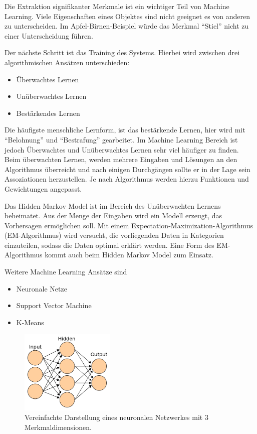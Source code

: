 Die Extraktion signifikanter Merkmale ist ein wichtiger Teil von Machine Learning. Viele Eigenschaften eines Objektes sind nicht geeignet es von anderen zu unterscheiden. Im Apfel-Birnen-Beispiel würde das Merkmal ``Stiel'' nicht zu einer Unterscheidung führen.

Der nächste Schritt ist das Training des Systems. Hierbei wird zwischen drei algorithmischen Ansätzen unterschieden:
\begin{itemize}
\item Überwachtes Lernen
\item Unüberwachtes Lernen
\item Bestärkendes Lernen
\end{itemize}
Die häufigste menschliche Lernform, ist das bestärkende Lernen, hier wird mit ``Belohnung'' und ``Bestrafung'' gearbeitet. 
Im Machine Learning Bereich ist jedoch Überwachtes und Unüberwachtes Lernen sehr viel häufiger zu finden. Beim überwachten Lernen, werden mehrere Eingaben und Lösungen an den Algorithmus überreicht und nach einigen Durchgängen sollte er in der Lage  sein Assoziationen herzustellen. Je nach Algorithmus werden hierzu Funktionen und Gewichtungen angepasst. 

Das Hidden Markov Model ist im Bereich des Unüberwachten Lernens beheimatet. Aus der Menge der Eingaben wird ein Modell erzeugt, das Vorhersagen ermöglichen soll. Mit einem Expectation-Maximization-Algorithmus (EM-Algorithmus) wird versucht, die vorliegenden Daten in Kategorien einzuteilen, sodass die Daten optimal erklärt werden. Eine Form des EM-Algorithmus kommt auch beim Hidden Markov Model zum Einsatz.

Weitere Machine Learning Ansätze sind 
\begin{itemize}
\item Neuronale Netze
\item Support Vector Machine
\item K-Means
\end{itemize} 

\begin{figure}[htbp] \centering
    \includegraphics[width=0.4\textwidth]{Bilder/Kap1/neuralnetwork}
    \caption{ Vereinfachte Darstellung eines neuronalen Netzwerkes mit 3 Merkmaldimensionen. }
    \label{fig:neural}
\end{figure}

